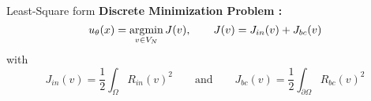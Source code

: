 \begin{frame}{Least-Square form}
	\textbf{Discrete Minimization Problem :}
	\begin{equation*}
		\displaystyle u_\theta(x)=\operatorname*{argmin}_{v\in V_N} J(v), \qquad J(v)=J_{in}(v)+J_{bc}(v)\label{minpb_leastsquare}
	\end{equation*}
	with 
	\begin{equation*}
		J_{in}(v)=\frac{1}{2}\int_\Omega R_{in}(v)^2  \qquad \text{and} \qquad J_{bc}(v)=\frac{1}{2}\int_{\partial\Omega} R_{bc}(v)^2
	\end{equation*}
	
%			
%			
%			
%			
%			
%			

\end{frame}
